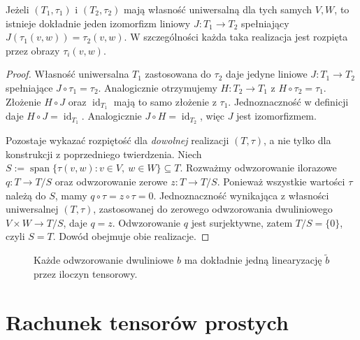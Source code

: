 \begin{twierdzenie}
\label{thm:lin10-jednoznacznosc}
Jeżeli \((T_1,\tau_1)\) i
\((T_2,\tau_2)\) mają własność
uniwersalną dla tych samych \(V,W\),
to istnieje dokładnie jeden
izomorfizm liniowy \(J\colon T_1\to T_2\)
spełniający
\(J(\tau_1(v,w))=\tau_2(v,w)\).
W szczególności każda taka realizacja
jest rozpięta przez obrazy \(\tau_i(v,w)\).
\end{twierdzenie}
\begin{proof}
Własność uniwersalna \(T_1\)
zastosowana do \(\tau_2\) daje
jedyne liniowe \(J\colon T_1\to T_2\)
spełniające \(J\circ\tau_1=\tau_2\).
Analogicznie otrzymujemy
\(H\colon T_2\to T_1\) z
\(H\circ\tau_2=\tau_1\).
Złożenie \(H\circ J\) oraz
\(\operatorname{id}_{T_1}\)
mają to samo złożenie z \(\tau_1\).
Jednoznaczność w definicji daje
\(H\circ J=\operatorname{id}_{T_1}\).
Analogicznie
\(J\circ H=\operatorname{id}_{T_2}\),
więc \(J\) jest izomorfizmem.

Pozostaje wykazać rozpiętość
dla \emph{dowolnej} realizacji
\((T,\tau)\), a nie tylko
dla konstrukcji z poprzedniego
twierdzenia. Niech
\(S:=\operatorname{span}\{\tau(v,w):
v\in V,\ w\in W\}\subseteq T\).
Rozważmy odwzorowanie ilorazowe
\(q\colon T\to T/S\) oraz
odwzorowanie zerowe
\(z\colon T\to T/S\).
Ponieważ wszystkie wartości
\(\tau\) należą do \(S\),
mamy \(q\circ\tau=z\circ\tau=0\).
Jednoznaczność wynikająca
z własności uniwersalnej \((T,\tau)\),
zastosowanej do zerowego
odwzorowania dwuliniowego
\(V\times W\to T/S\),
daje \(q=z\).
Odwzorowanie \(q\)
jest surjektywne, zatem
\(T/S=\{0\}\), czyli \(S=T\).
Dowód obejmuje obie realizacje.
\end{proof}

\begin{figure}[!htbp]
\centering
{}
\caption{Każde odwzorowanie dwuliniowe
\(b\) ma dokładnie jedną linearyzację
\(\widetilde b\) przez iloczyn tensorowy.}
\label{fig:lin10-uniwersalna}
\end{figure}

\section{Rachunek tensorów prostych}
\label{sec:lin10-proste}

